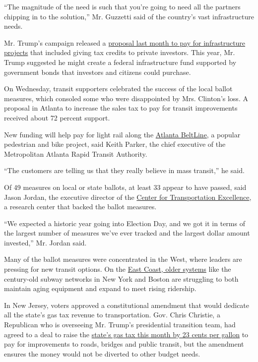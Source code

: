``The magnitude of the need is such that you're going to need all the
partners chipping in to the solution,'' Mr. Guzzetti said of the
country's vast infrastructure needs.

Mr. Trump's campaign released a
\href{http://peternavarro.com/sitebuildercontent/sitebuilderfiles/infrastructurereport.pdf}{proposal
last month to pay for infrastructure projects} that included giving tax
credits to private investors. This year, Mr. Trump suggested he might
create a federal infrastructure fund supported by government bonds that
investors and citizens could purchase.

On Wednesday, transit supporters celebrated the success of the local
ballot measures, which consoled some who were disappointed by Mrs.
Clinton's loss. A proposal in Atlanta to increase the sales tax to pay
for transit improvements received about 72 percent support.

New funding will help pay for light rail along the
\href{http://www.nytimes.com/2016/09/12/us/atlanta-beltline.html}{Atlanta
BeltLine}, a popular pedestrian and bike project, said Keith Parker, the
chief executive of the Metropolitan Atlanta Rapid Transit Authority.

``The customers are telling us that they really believe in mass
transit,'' he said.

Of 49 measures on local or state ballots, at least 33 appear to have
passed, said Jason Jordan, the executive director of the
\href{https://www.cfte.org/}{Center for Transportation Excellence}, a
research center that backed the ballot measures.

``We expected a historic year going into Election Day, and we got it in
terms of the largest number of measures we've ever tracked and the
largest dollar amount invested,'' Mr. Jordan said.

Many of the ballot measures were concentrated in the West, where leaders
are pressing for new transit options. On the
\href{http://www.nytimes.com/2016/05/27/nyregion/no-silver-bullet-as-subways-in-the-northeast-show-their-age.html}{East
Coast, older systems} like the century-old subway networks in New York
and Boston are struggling to both maintain aging equipment and expand to
meet rising ridership.

In New Jersey, voters approved a constitutional amendment that would
dedicate all the state's gas tax revenue to transportation. Gov. Chris
Christie, a Republican who is overseeing Mr. Trump's presidential
transition team, had agreed to a deal to raise the
\href{http://www.nytimes.com/2016/11/02/nyregion/as-days-of-cheap-gas-end-in-new-jersey-drivers-descend-for-a-last-fill-up.html}{state's
gas tax this month by 23 cents per gallon} to pay for improvements to
roads, bridges and public transit, but the amendment ensures the money
would not be diverted to other budget needs.

